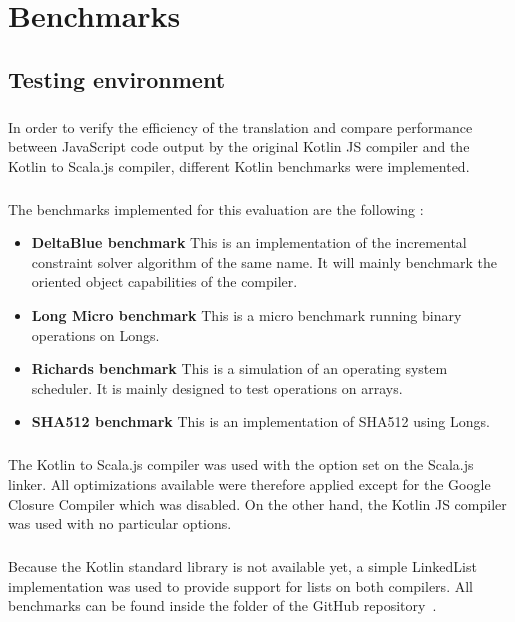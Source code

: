 
\chapter{Benchmarks}
\section{Testing environment}
\paragraph{} In order to verify the efficiency of the translation and compare performance 
between JavaScript code output by the original Kotlin JS compiler and the Kotlin to Scala.js 
compiler, different Kotlin benchmarks were implemented.

\paragraph{} The benchmarks implemented for this evaluation are the following :

\begin{itemize}
 \item \textbf{DeltaBlue benchmark} This is an implementation of the incremental constraint 
solver algorithm of the same name. It will mainly benchmark the oriented object capabilities of the 
compiler.
 \item \textbf{Long Micro benchmark} This is a micro benchmark running binary operations on Longs.
 \item \textbf{Richards benchmark} This is a simulation of an operating system scheduler. It is 
mainly designed to test operations on arrays.
 \item \textbf{SHA512 benchmark} This is an implementation of SHA512 using Longs.
\end{itemize}

\paragraph{} The Kotlin to Scala.js compiler was used with the  option set on 
the Scala.js linker. All optimizations available were therefore applied except for the Google 
Closure Compiler which was disabled. On the other hand, the Kotlin JS compiler was used with no 
particular options. %

\paragraph{} Because the Kotlin standard library is not available yet, a simple LinkedList 
implementation was used to provide support for lists on both compilers. All benchmarks can 
be found inside the  folder of the GitHub
repository~\cite{kotlin_scalajs_v2}.

